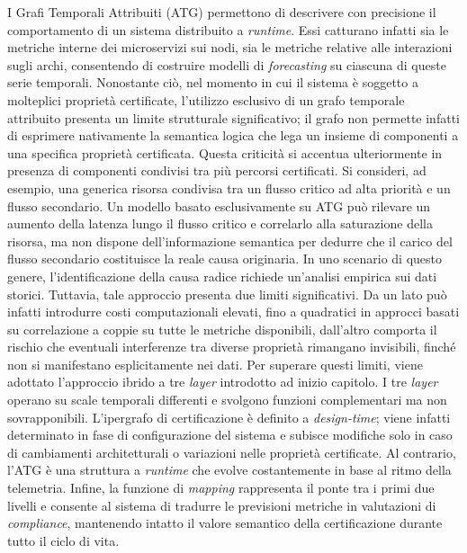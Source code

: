 I Grafi Temporali Attribuiti (\gls{ATG}) permettono di descrivere con precisione il comportamento
di un sistema distribuito a \textit{runtime}. Essi catturano infatti sia le metriche interne dei
microservizi sui nodi, sia le metriche relative alle interazioni sugli archi, consentendo di
costruire modelli di \textit{forecasting} su ciascuna di queste serie temporali. Nonostante ciò,
nel momento in cui il sistema è soggetto a molteplici proprietà certificate, l'utilizzo esclusivo
di un grafo temporale attribuito presenta un limite strutturale significativo; il grafo non permette
infatti di esprimere nativamente la semantica logica che lega un insieme di componenti a una
specifica proprietà certificata.
Questa criticità si accentua ulteriormente in presenza di componenti condivisi tra più percorsi
certificati. Si consideri, ad esempio, una generica risorsa condivisa tra un flusso critico ad alta
priorità e un flusso secondario. Un modello basato esclusivamente su \gls{ATG} può rilevare un
aumento della latenza lungo il flusso critico e correlarlo alla saturazione della risorsa, ma non
dispone dell'informazione semantica per dedurre che il carico del flusso secondario costituisce la
reale causa originaria. In uno scenario di questo genere, l'identificazione della causa radice
richiede un'analisi empirica sui dati storici. Tuttavia, tale approccio presenta due limiti
significativi. Da un lato può infatti introdurre costi computazionali elevati, fino a quadratici in
approcci basati su correlazione a coppie su tutte le metriche disponibili, dall'altro comporta il
rischio che eventuali interferenze tra diverse proprietà rimangano invisibili, finché non si
manifestano esplicitamente nei dati. Per superare questi limiti, viene adottato l'approccio ibrido
a tre \textit{layer} introdotto ad inizio capitolo. I tre \textit{layer} operano su scale temporali
differenti e svolgono funzioni complementari ma non sovrapponibili. L'ipergrafo di certificazione è
definito a \textit{design-time}; viene infatti determinato in fase di configurazione del sistema e
subisce modifiche solo in caso di cambiamenti architetturali o variazioni nelle proprietà
certificate. Al contrario, l'\gls{ATG} è una struttura a \textit{runtime} che evolve costantemente
in base al ritmo della telemetria. Infine, la funzione di \textit{mapping} rappresenta il ponte tra
i primi due livelli e consente al sistema di tradurre le previsioni metriche in valutazioni di
\textit{compliance}, mantenendo intatto il valore semantico della certificazione durante tutto il
ciclo di vita.

